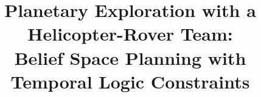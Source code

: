 \documentclass[letterpaper]{article} %
\begin{document}

\title{\huge Planetary Exploration with a Helicopter-Rover Team:\\
Belief Space Planning with Temporal Logic Constraints}


\author{ }



% 

\maketitle
\end{document}
